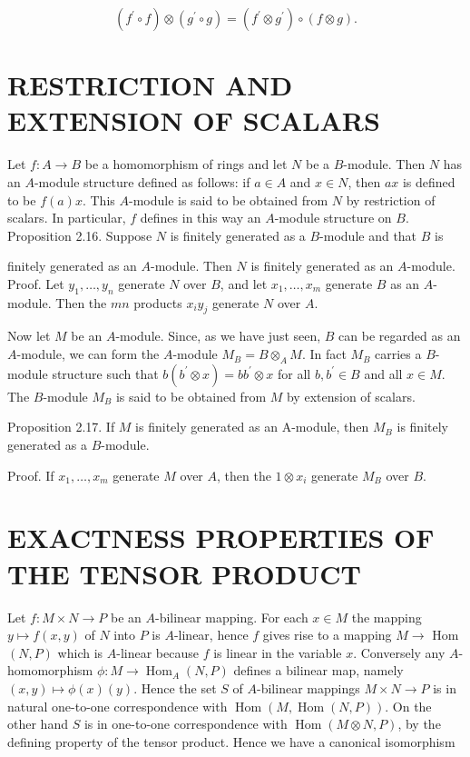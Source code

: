 \documentclass{standalone}
\theoremstyle{definition}
\theoremstyle{remark}
\begin{document}
\[
\left(f^{\prime} \circ f\right) \otimes\left(g^{\prime} \circ g\right)=\left(f^{\prime} \otimes g^{\prime}\right) \circ(f \otimes g) .
\]

\section{RESTRICTION AND EXTENSION OF SCALARS}
Let $f: A \rightarrow B$ be a homomorphism of rings and let $N$ be a $B$-module. Then $N$ has an $A$-module structure defined as follows: if $a \in A$ and $x \in N$, then $a x$ is defined to be $f(a) x$. This $A$-module is said to be obtained from $N$ by restriction of scalars. In particular, $f$ defines in this way an $A$-module structure on $B$. Proposition 2.16. Suppose $N$ is finitely generated as a $B$-module and that $B$ is

finitely generated as an $A$-module. Then $N$ is finitely generated as an $A$-module. Proof. Let $y_{1}, \ldots, y_{n}$ generate $N$ over $B$, and let $x_{1}, \ldots, x_{m}$ generate $B$ as an $A$-module. Then the $m n$ products $x_{i} y_{j}$ generate $N$ over $A$.

Now let $M$ be an $A$-module. Since, as we have just seen, $B$ can be regarded as an $A$-module, we can form the $A$-module $M_{B}=B \otimes_{A} M$. In fact $M_{B}$ carries a $B$-module structure such that $b\left(b^{\prime} \otimes x\right)=b b^{\prime} \otimes x$ for all $b, b^{\prime} \in B$ and all $x \in M$. The $B$-module $M_{B}$ is said to be obtained from $M$ by extension of scalars.

Proposition 2.17. If $M$ is finitely generated as an A-module, then $M_{B}$ is finitely generated as a $B$-module.

Proof. If $x_{1}, \ldots, x_{m}$ generate $M$ over $A$, then the $1 \otimes x_{i}$ generate $M_{B}$ over $B$.

\section{EXACTNESS PROPERTIES OF THE TENSOR PRODUCT}
Let $f: M \times N \rightarrow P$ be an $A$-bilinear mapping. For each $x \in M$ the mapping $y \mapsto f(x, y)$ of $N$ into $P$ is $A$-linear, hence $f$ gives rise to a mapping $M \rightarrow$ Hom $(N, P)$ which is $A$-linear because $f$ is linear in the variable $x$. Conversely any $A$-homomorphism $\phi: M \rightarrow \operatorname{Hom}_{A}(N, P)$ defines a bilinear map, namely $(x, y) \mapsto \phi(x)(y)$. Hence the set $S$ of $A$-bilinear mappings $M \times N \rightarrow P$ is in natural one-to-one correspondence with $\operatorname{Hom}(M, \operatorname{Hom}(N, P))$. On the other hand $S$ is in one-to-one correspondence with $\operatorname{Hom}(M \otimes N, P)$, by the defining property of the tensor product. Hence we have a canonical isomorphism
\end{document}
